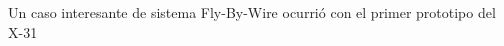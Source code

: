                          

          







Un caso interesante de sistema Fly-By-Wire ocurrió con el primer prototipo del X-31

